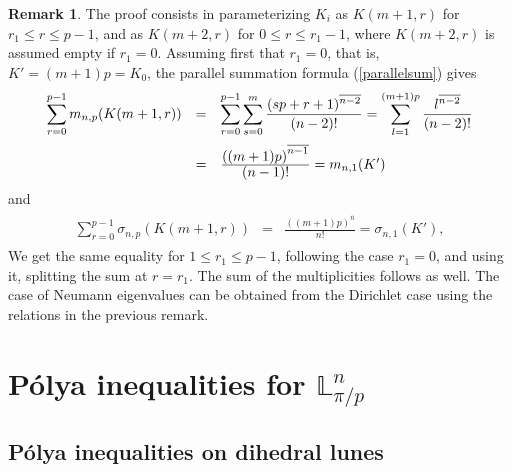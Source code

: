 \documentclass[11pt,a4paper,times]{amsart}
\theoremstyle{plain}
\theoremstyle{definition}
\newtheorem{remark}{Remark}[section]
\numberwithin{equation}{section}
\newcommand{\ds}{\displaystyle}
\newcommand{\dsum}{\ds\sum}
\newcommand{\eqskip}{ \vspace*{2mm}\\ }
\newcommand{\fr}[2]{\frac{\ds #1}{\ds #2}}
\newcommand{\lune}[2]{\mathbb{L}^{#1}_{#2}}
\newcommand{\txtg}{\textcolor{green}}
\begin{document}
{\begin{remark}
The proof consists in  parameterizing $K_i$ as
$K(m+1,r)$ for $r_1\leq r\leq  p-1$, and as $K(m+2,r)$ for $0\leq r\leq r_1-1$, where    $K(m+2,r)$ is assumed empty if $r_1=0$.
Assuming first that $r_1=0$, that is, $K'=(m+1)p=K_0$,  the
parallel summation formula (\ref{parallelsum}) gives
\begin{gather*}
\begin{array}{lll}
\dsum_{r=0}^{p-1}m_{n,p}(K(m+1,r)) & = & \dsum_{r=0}^{p-1}\dsum_{s=0}^{m}\frac{(sp +r+1)^{\overline{n-2}}}{(n-2)!}
 = \dsum_{l=1}^{(m+1)p} \frac{l^{\overline{n-2}}}{(n-2)!}\eqskip
 & = & \fr{\left( (m+1) p\right)^{\overline{n-1}}}{(n-1)!}=m_{n,1}(K')
 \end{array}
\end{gather*}
and
\begin{gather*}
\begin{array}{lll}
\dsum_{r=0}^{p-1}\sigma_{n,p}(K(m+1,r))
 & = &\fr{\left( (m+1)p\right)^{\overline{n}}}{n!}=\sigma_{n,1}(K'),
 \end{array}
\end{gather*}  
We get the same equality for $1\leq r_1\leq p-1$, following the case $r_1=0$, and using it, splitting the sum at $r=r_1$.
The sum of the multiplicities follows as well.
The case of Neumann eigenvalues can be obtained  from the Dirichlet case using  the relations  in the previous remark.
 \end{remark}
%
\section{P\'{o}lya inequalities for $\lune{n}{\pi/p}$}\label{Sec 5}

\subsection{P\'{o}lya inequalities on dihedral lunes\label{introEIGEN}}

}
\end{document}
